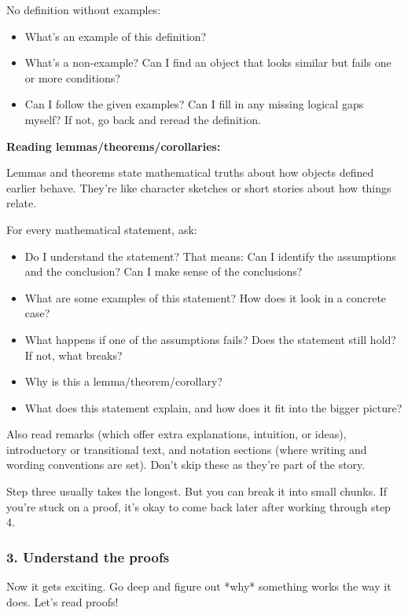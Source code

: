 \documentclass[paper=a4, fontsize=12pt]{scrartcl} %
\begin{document}
No definition without examples:
\begin{itemize}
\item What’s an example of this definition?
\item What’s a non-example? Can I find an object that looks similar but fails one or more conditions?
\item Can I follow the given examples? Can I fill in any missing logical gaps myself? If not, go back and reread the definition.
\end{itemize}

\medskip

\noindent
\textbf{Reading lemmas/theorems/corollaries:}

Lemmas and theorems state mathematical truths about how objects defined earlier behave. They’re like character sketches or short stories about how things relate.

For every mathematical statement, ask:
\begin{itemize}
\item Do I understand the statement? That means: Can I identify the assumptions and the conclusion? Can I make sense of the conclusions?
\item What are some examples of this statement? How does it look in a concrete case?
\item What happens if one of the assumptions fails? Does the statement still hold? If not, what breaks?
\item Why is this a lemma/theorem/corollary?
\item What does this statement explain, and how does it fit into the bigger picture?
\end{itemize}

Also read remarks (which offer extra explanations, intuition, or ideas), introductory or transitional text, and notation sections (where writing and wording conventions are set). Don’t skip these as they’re part of the story.

Step three usually takes the longest. But you can break it into small chunks. If you’re stuck on a proof, it’s okay to come back later after working through step 4.

\subsubsection*{3. Understand the proofs}

Now it gets exciting. Go deep and figure out *why* something works the way it does. Let’s read proofs!
\end{document}
